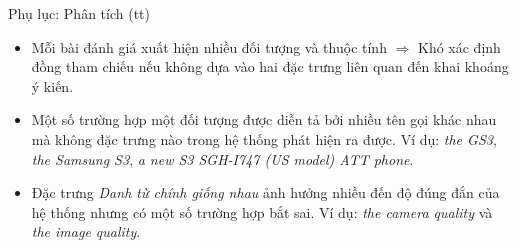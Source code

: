 \documentclass[9pt,xcolor=table,hyperref=unicode]{beamer}
\begin{document}
		\begin{frame}{Phụ lục: Phân tích (tt)}			
			\begin{itemize}
				\item{Mỗi bài đánh giá xuất hiện nhiều đối tượng và thuộc tính $\Rightarrow$ Khó xác định đồng tham chiếu nếu không dựa vào hai đặc trưng liên quan đến khai khoáng ý kiến.}
				\item{Một số trường hợp một đối tượng được diễn tả bởi nhiều tên gọi khác nhau mà không đặc trưng nào trong hệ thống phát hiện ra được. Ví dụ: \textit{the GS3}, \textit{the Samsung S3}, \textit{a new S3 SGH-I747 (US model) ATT phone}.}
				\item{Đặc trưng \textit{Danh từ chính giống nhau} ảnh hưởng nhiều đến độ đúng đắn của hệ thống nhưng có một số trường hợp bắt sai. Ví dụ: \textit{the camera quality} và \textit{the image quality}.}
			\end{itemize}			
		\end{frame}
\end{document}

